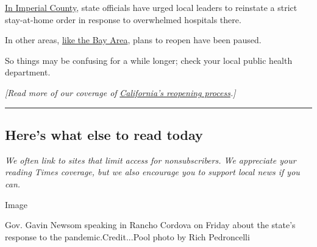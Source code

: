 \href{https://www.nytimes.com/2020/06/07/us/coronavirus-border-mexico-california-el-centro.html}{In
Imperial County}, state officials have urged local leaders to reinstate
a strict stay-at-home order in response to overwhelmed hospitals there.

In other areas,
\href{https://www.sfchronicle.com/bayarea/article/Coranivirus-cases-climb-Bay-Area-counties-pause-15375230.php}{like
the Bay Area}, plans to reopen have been paused.

So things may be confusing for a while longer; check your local public
health department.

\emph{{[}Read more of our coverage of}
\href{https://www.nytimes.com/article/coronavirus-california-reopening-phases.html}{\emph{California's
reopening process}}\emph{.{]}}

\begin{center}\rule{0.5\linewidth}{\linethickness}\end{center}

\hypertarget{heres-what-else-to-read-today}{%
\subsection{Here's what else to read
today}\label{heres-what-else-to-read-today}}

\emph{We often link to sites that limit access for nonsubscribers. We
appreciate your reading Times coverage, but we also encourage you to
support local news if you can.}

Image

Gov. Gavin Newsom speaking in Rancho Cordova on Friday about the state's
response to the pandemic.Credit...Pool photo by Rich Pedroncelli


